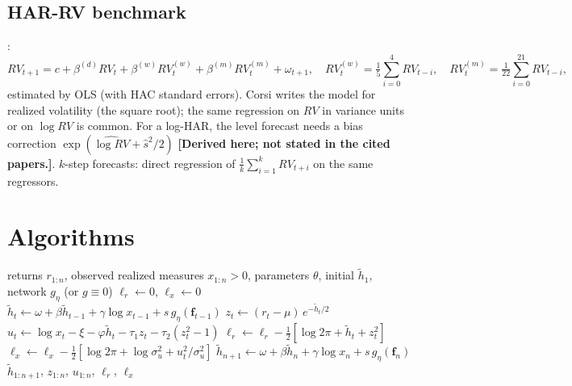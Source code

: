 \documentclass[11pt]{article}
\newcommand{\lh}{\tilde h}
\newcommand{\derived}{\textbf{[Derived here; not stated in the cited papers.]}}
\begin{document}
\subsection{HAR-RV benchmark}
\cite{Corsi2009}:
\begin{equation}\label{eq:har}
RV_{t+1} = c + \beta^{(d)}RV_t + \beta^{(w)}RV^{(w)}_t + \beta^{(m)}RV^{(m)}_t + \omega_{t+1},\quad
RV^{(w)}_t=\tfrac15\sum_{i=0}^{4}RV_{t-i},\quad RV^{(m)}_t=\tfrac1{22}\sum_{i=0}^{21}RV_{t-i},
\end{equation}
estimated by OLS (with HAC standard errors). Corsi writes the model for realized volatility
(the square root); the same regression on $RV$ in variance units or on $\log RV$ is common.
For a log-HAR, the level forecast needs a bias correction $\exp(\widehat{\log RV}+\hat s^2/2)$
\derived. $k$-step forecasts: direct regression of $\frac1k\sum_{i=1}^k RV_{t+i}$ on the same
regressors.

\section{Algorithms}

\begin{algorithm}[h]
\caption{Realized GARCH filter (log-linear, with optional NN correction)}\label{alg:filter}
\begin{algorithmic}[1]
\Require returns $r_{1:n}$, observed realized measures $x_{1:n}>0$, parameters $\theta$, initial $\lh_1$, network $g_\eta$ (or $g\equiv0$)
\State $\ell_r\gets0$, $\ell_x\gets0$
    \State $\lh_t\gets\omega+\beta\lh_{t-1}+\gamma\log x_{t-1}+s\,g_\eta(\mathbf f_{t-1})$ 
  \EndIf
  \State $z_t\gets(r_t-\mu)\,e^{-\lh_t/2}$
  \State $u_t\gets\log x_t-\xi-\varphi\lh_t-\tau_1z_t-\tau_2(z_t^2-1)$
  \State $\ell_r\gets\ell_r-\frac12[\log2\pi+\lh_t+z_t^2]$
  \State $\ell_x\gets\ell_x-\frac12[\log2\pi+\log\sigma_u^2+u_t^2/\sigma_u^2]$
\EndFor
\State $\lh_{n+1}\gets\omega+\beta\lh_n+\gamma\log x_n+s\,g_\eta(\mathbf f_n)$ 
\State \Return $\lh_{1:n+1}$, $z_{1:n}$, $u_{1:n}$, $\ell_r$, $\ell_x$
\end{algorithmic}
\end{algorithm}
\end{document}
